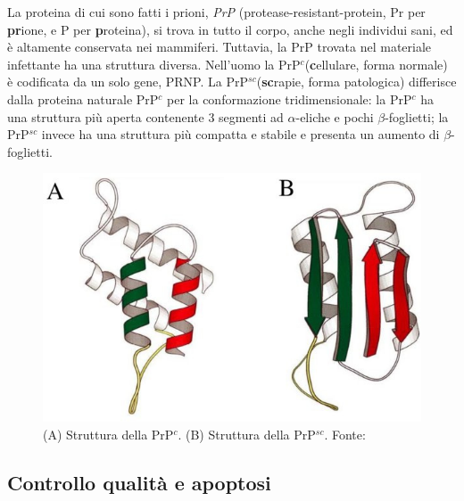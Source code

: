 {{\par La proteina di cui sono fatti i prioni, \textit{PrP} (protease-resistant-protein, Pr per \textbf{pr}ione, e P per \textbf{p}roteina), si trova in tutto il corpo, anche negli individui sani, ed è altamente conservata nei mammiferi. Tuttavia, la PrP trovata nel materiale infettante ha una struttura diversa. Nell'uomo la PrP$^{c}$(\textbf{c}ellulare, forma normale) è codificata da un solo gene, PRNP. La PrP$^{sc}$(\textbf{sc}rapie, forma patologica) differisce dalla proteina naturale PrP$^{c}$ per la conformazione tridimensionale: la PrP$^{c}$ ha una struttura più aperta contenente 3 segmenti ad $\alpha$-eliche e pochi $\beta$-foglietti; la PrP$^{sc}$ invece ha una struttura più compatta e stabile e presenta un aumento di $\beta$-foglietti.

\begin{figure}[h]
	\centering
	\includegraphics{images/PrPc.jpg}
	\caption{(A) Struttura della PrP$^{c}$. (B) Struttura della PrP$^{sc}$. Fonte: \cite{ruttkay2015prion}}
	\label{fig:PrPc}
\end{figure} 

}
\subsection{Controllo qualità e apoptosi}
{
}}
